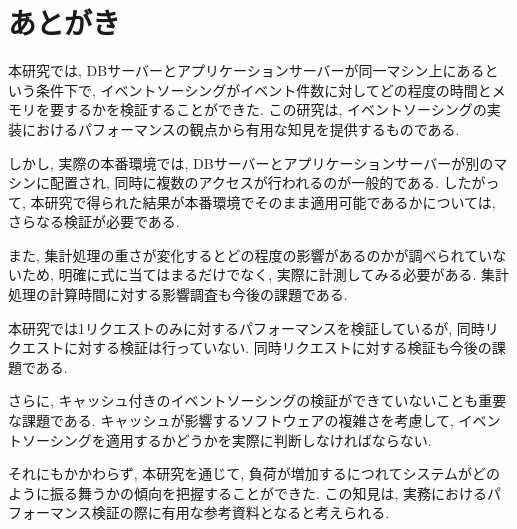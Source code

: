 \documentclass[../../main]{subfiles}
\begin{document}
    \section{あとがき}\label{sec:afterword}

    本研究では, DBサーバーとアプリケーションサーバーが同一マシン上にあるという条件下で, イベントソーシングがイベント件数に対してどの程度の時間とメモリを要するかを検証することができた. この研究は, イベントソーシングの実装におけるパフォーマンスの観点から有用な知見を提供するものである.

    しかし, 実際の本番環境では, DBサーバーとアプリケーションサーバーが別のマシンに配置され, 同時に複数のアクセスが行われるのが一般的である. したがって, 本研究で得られた結果が本番環境でそのまま適用可能であるかについては, さらなる検証が必要である.

    また, 集計処理の重さが変化するとどの程度の影響があるのかが調べられていないため, 明確に式に当てはまるだけでなく, 実際に計測してみる必要がある. 集計処理の計算時間に対する影響調査も今後の課題である.

    本研究では1リクエストのみに対するパフォーマンスを検証しているが, 同時リクエストに対する検証は行っていない. 同時リクエストに対する検証も今後の課題である.

    さらに, キャッシュ付きのイベントソーシングの検証ができていないことも重要な課題である. キャッシュが影響するソフトウェアの複雑さを考慮して, イベントソーシングを適用するかどうかを実際に判断しなければならない.

    それにもかかわらず, 本研究を通じて, 負荷が増加するにつれてシステムがどのように振る舞うかの傾向を把握することができた. この知見は, 実務におけるパフォーマンス検証の際に有用な参考資料となると考えられる.

    \clearpage
\end{document}
